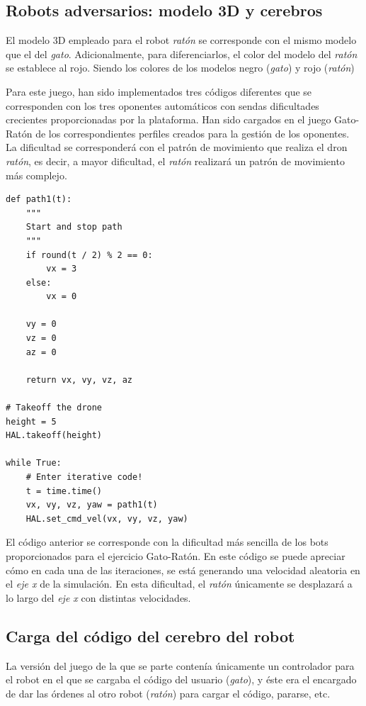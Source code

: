 \documentclass[a4paper, 12pt]{book}
\begin{document}
\subsection{Robots adversarios: modelo 3D y cerebros}

El modelo 3D empleado para el robot \emph{ratón} se corresponde con el mismo modelo que el del \emph{gato}. Adicionalmente, para diferenciarlos, el color del modelo del \emph{ratón} se establece al rojo. Siendo los colores de los modelos negro (\emph{gato}) y rojo (\emph{ratón})

Para este juego, han sido implementados tres códigos diferentes que se corresponden con los tres oponentes automáticos con sendas dificultades crecientes proporcionadas por la plataforma. Han sido cargados en el juego Gato-Ratón de los correspondientes perfiles creados para la gestión de los oponentes. La dificultad se corresponderá con el patrón de movimiento que realiza el dron \emph{ratón}, es decir, a mayor dificultad, el \emph{ratón} realizará un patrón de movimiento más complejo.

\begin{lstlisting}[basicstyle=\ttfamily\scriptsize]
def path1(t):
	"""
	Start and stop path
	"""
	if round(t / 2) % 2 == 0:
		vx = 3
	else:
		vx = 0

	vy = 0
	vz = 0
	az = 0

	return vx, vy, vz, az
	
# Takeoff the drone
height = 5
HAL.takeoff(height)

while True:
    # Enter iterative code!
    t = time.time()
    vx, vy, vz, yaw = path1(t)
    HAL.set_cmd_vel(vx, vy, vz, yaw)
\end{lstlisting}

El código anterior se corresponde con la dificultad más sencilla de los bots proporcionados para el ejercicio Gato-Ratón. En este código se puede apreciar cómo en cada una de las iteraciones, se está generando una velocidad aleatoria en el \emph{eje x} de la simulación. En esta dificultad, el \emph{ratón} únicamente se desplazará a lo largo del \emph{eje x} con distintas velocidades.

\subsection{Carga del código del cerebro del robot}
\label{drone_cat_mouse_code_load}

La versión del juego de la que se parte contenía únicamente un controlador para el robot en el que se cargaba el código del usuario (\emph{gato}), y éste era el encargado de dar las órdenes al otro robot (\emph{ratón}) para cargar el código, pararse, etc.
\end{document}
